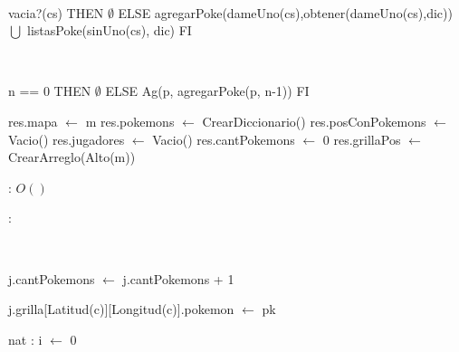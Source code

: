 \begin{Representacion}
	~

	{\IF vacia?(cs) THEN
		$\emptyset$
	ELSE
		agregarPoke(dameUno(cs),obtener(dameUno(cs),dic)) $\bigcup$ listasPoke(sinUno(cs), dic)
	FI}
		
	~

	{\IF n == 0 THEN
		$\emptyset$
	ELSE
		Ag(p, agregarPoke(p, n-1))
	FI}


\end{Representacion}


\begin{Algoritmos}

	\begin{algorithm}[H]
		\NoCaptionOfAlgo
		\caption{}
		res.mapa $\leftarrow$ m\;
		res.pokemons $\leftarrow$ CrearDiccionario()\;
		res.posConPokemons $\leftarrow$ Vacio()\;
		res.jugadores $\leftarrow$ Vacio()\;
		res.cantPokemons $\leftarrow$ 0\;
		res.grillaPos $\leftarrow$ CrearArreglo(Alto(m))\;
	\end{algorithm}

	\complejidad: $O()$

	\justifcomp:

	~

	\begin{algorithm}[H]
		\NoCaptionOfAlgo
		\caption{}
		j.cantPokemons $\leftarrow$ j.cantPokemons + 1\;

		j.grilla[Latitud(c)][Longitud(c)].pokemon $\leftarrow$ pk\;

		nat : i $\leftarrow$ 0\;
	\end{algorithm}


\end{Algoritmos}

